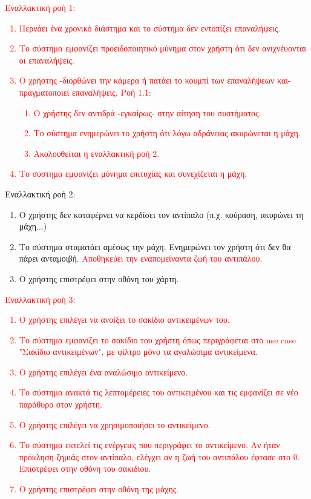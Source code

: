 \textcolor{red}{
Εναλλακτική ροή 1:
\begin{enumerate}[label=5.\alph*.,ref=5.\alph*]
    \item Περνάει ένα χρονικό διάστημα και το σύστημα δεν εντοπίζει επαναλήψεις.
    \item Το σύστημα εμφανίζει προειδοποιητικό μύνημα στον χρήστη ότι δεν ανιχνέυονται οι επαναλήψεις.
    \item Ο χρήστης -διορθώνει την κάμερα ή πατάει το κουμπί των επαναλήψεων και- πραγματοποιεί επαναλήψεις.
     Ροή 1.1:
    \begin{enumerate}[label=5.3.\alph*.,ref=5.3.\alph*]
        \item Ο χρήστης δεν αντιδρά -εγκαίρως- στην αίτηση του συστήματος.
        \item Το σύστημα ενημερώνει το χρήστη ότι λόγω αδράνειας ακυρώνεται η μάχη.
        \item Ακολουθείται η εναλλακτική ροή 2.
    \end{enumerate}
    \item Το σύστημα εμφανίζει μύνημα επιτυχίας και συνεχίζεται η μάχη.
\end{enumerate}
}

Εναλλακτική ροή 2:
\begin{enumerate}[label=6.\alph*.,ref=6.\alph*]
    \item Ο χρήστης δεν καταφέρνει να κερδίσει τον αντίπαλο (π.χ. κούραση, ακυρώνει τη μάχη...)
    \item Το σύστημα σταματάει αμέσως την μάχη. Ενημερώνει τον χρήστη ότι δεν θα πάρει ανταμοιβή. \textcolor{red}{Αποθηκεύει
την εναπομείναντα ζωή του αντιπάλου.}
    \item Ο χρήστης επιστρέφει στην οθόνη του χάρτη.
\end{enumerate}

\textcolor{red}{
Εναλλακτική ροή 3:
\begin{enumerate}[label=4.\alph*.,ref=4.\alph*]
    \item Ο χρήστης επιλέγει να ανοίξει το σακίδιο αντικειμένων του.
    \item Το σύστημα εμφανίζει το σακίδιο του χρήστη όπως περιγράφεται στο use case "Σακίδιο αντικειμένων", με φίλτρο μόνο τα αναλώσιμα αντικείμενα.
    \item Ο χρήστης επιλέγει ένα αναλώσιμο αντικείμενο.
    \item Το σύστημα ανακτά τις λεπτομέρειες του αντικειμένου και τις εμφανίζει σε νέο παράθυρο στον χρήστη.
    \item Ο χρήστης επιλέγει να χρησιμοποιήσει το αντικείμενο.
    \item Το σύστημα εκτελεί τις ενέργειες που περιγράφει το αντικείμενο. Αν ήταν πρόκληση ζημιάς στον αντίπαλο, ελέγχει αν η ζωή του αντιπάλου έφτασε στο 0. Επιστρέφει στην οθόνη του σακιδίου.
    \item Ο χρήστης επιστρέφει στην οθόνη της μάχης.
\end{enumerate}
}


